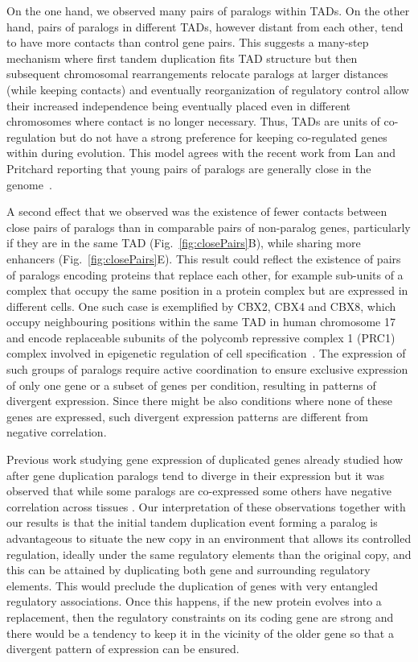 \documentclass[a4paper,twoside=true,openright,parskip=full,chapterprefix=true,11pt,headings=normal,bibliography=totoc,listof=totoc,titlepage=on,captions=tableabove,draft=false]{scrreprt}
\theoremstyle{definition}
\theoremstyle{definition}
\theoremstyle{definition}
\theoremstyle{remark}
\begin{document}
On the one hand, we observed many pairs of paralogs within TADs. On the
other hand, pairs of paralogs in different TADs, however distant from
each other, tend to have more contacts than control gene pairs. This
suggests a many-step mechanism where first tandem duplication fits TAD
structure but then subsequent chromosomal rearrangements relocate
paralogs at larger distances (while keeping contacts) and eventually
reorganization of regulatory control allow their increased independence
being eventually placed even in different chromosomes where contact is
no longer necessary. Thus, TADs are units of co-regulation but do not
have a strong preference for keeping co-regulated genes within during
evolution. This model agrees with the recent work from Lan and Pritchard
reporting that young pairs of paralogs are generally close in the
genome~\citep{Lan2016}.

A second effect that we observed was the existence of fewer contacts
between close pairs of paralogs than in comparable pairs of non-paralog
genes, particularly if they are in the same TAD
(Fig.~\ref{fig:closePairs}B), while sharing more enhancers
(Fig.~\ref{fig:closePairs}E). This result could reflect the existence of
pairs of paralogs encoding proteins that replace each other, for example
sub-units of a complex that occupy the same position in a protein
complex but are expressed in different cells. One such case is
exemplified by CBX2, CBX4 and CBX8, which occupy neighbouring positions
within the same TAD in human chromosome 17 and encode replaceable
subunits of the polycomb repressive complex 1 (PRC1) complex involved in
epigenetic regulation of cell specification~\citep{Becker2015}. The
expression of such groups of paralogs require active coordination to
ensure exclusive expression of only one gene or a subset of genes per
condition, resulting in patterns of divergent expression. Since there
might be also conditions where none of these genes are expressed, such
divergent expression patterns are different from negative correlation.

Previous work studying gene expression of duplicated genes already
studied how after gene duplication paralogs tend to diverge in their
expression \citep{Makova2003, Huminiecki2004, Rogozin2014} but it was
observed that while some paralogs are co-expressed some others have
negative correlation across tissues \citep{Makova2003}. Our
interpretation of these observations together with our results is that
the initial tandem duplication event forming a paralog is advantageous
to situate the new copy in an environment that allows its controlled
regulation, ideally under the same regulatory elements than the original
copy, and this can be attained by duplicating both gene and surrounding
regulatory elements. This would preclude the duplication of genes with
very entangled regulatory associations. Once this happens, if the new
protein evolves into a replacement, then the regulatory constraints on
its coding gene are strong and there would be a tendency to keep it in
the vicinity of the older gene so that a divergent pattern of expression
can be ensured.
\end{document}
